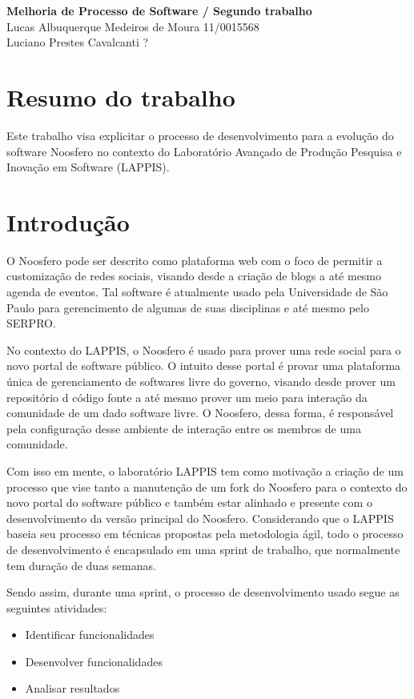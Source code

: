 \documentclass[a4paper, 11pt]{article}
\begin{document}
\noindent
\large\textbf{Melhoria de Processo de Software / Segundo trabalho}\\
Lucas Albuquerque Medeiros de Moura \hfill 11/0015568 \\
Luciano Prestes Cavalcanti \hfill ?

\section*{Resumo do trabalho}
Este trabalho visa explicitar o processo de desenvolvimento para a evolução do
software Noosfero no contexto do Laboratório Avançado de Produção Pesquisa e
Inovação em Software (LAPPIS).

\section*{Introdução}

O Noosfero pode ser descrito como plataforma web com o foco de permitir a
customização de redes sociais, visando desde a criação de blogs a até mesmo
agenda de eventos. Tal software é atualmente usado pela Universidade de São
Paulo para gerencimento de algumas de suas disciplinas e até mesmo pelo SERPRO.

No contexto do LAPPIS, o Noosfero é usado para prover uma rede social para o
novo portal de software público. O intuito desse portal é provar uma plataforma
única de gerenciamento de softwares livre do governo, visando desde prover um
repositório d código fonte a até mesmo prover um meio para interação da
comunidade de um dado software livre. O Noosfero, dessa forma, é responsável
pela configuração desse ambiente de interação entre os membros de uma
comunidade.

Com isso em mente, o laboratório LAPPIS tem como motivação a criação de um
processo que vise tanto a manutenção de um fork do Noosfero para o contexto do
novo portal do software público e também estar alinhado e presente com o
desenvolvimento da versão principal do Noosfero. Considerando que o LAPPIS
baseia seu processo em técnicas propostas pela metodologia ágil, todo o processo
de desenvolvimento é encapsulado em uma sprint de trabalho, que normalmente tem
duração de duas semanas.

Sendo assim, durante uma sprint, o processo de desenvolvimento usado segue as
seguintes atividades:

\begin{itemize}
    \item Identificar funcionalidades
    \item Desenvolver funcionalidades
    \item Analisar resultados
\end{itemize}
\end{document}
